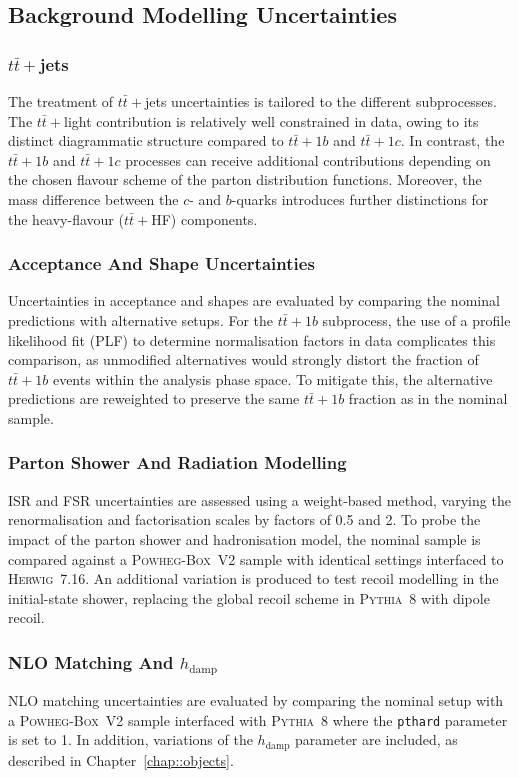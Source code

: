 \subsection{Background Modelling Uncertainties}

\subsubsection{$t\bar{t}+$jets}
The treatment of $t\bar{t}+$jets uncertainties is tailored to the different subprocesses. The $t\bar{t}+$light contribution is relatively well constrained in data, owing to its distinct diagrammatic structure compared to $t\bar{t}+1b$ and $t\bar{t}+1c$. In contrast, the $t\bar{t}+1b$ and $t\bar{t}+1c$ processes can receive additional contributions depending on the chosen flavour scheme of the parton distribution functions. Moreover, the mass difference between the $c$- and $b$-quarks introduces further distinctions for the heavy-flavour ($t\bar{t}+$HF) components.  

\subsubsection{Acceptance And Shape Uncertainties}
Uncertainties in acceptance and shapes are evaluated by comparing the nominal predictions with alternative setups. For the $t\bar{t}+1b$ subprocess, the use of a profile likelihood fit (PLF) to determine normalisation factors in data complicates this comparison, as unmodified alternatives would strongly distort the fraction of $t\bar{t}+1b$ events within the analysis phase space.  
To mitigate this, the alternative predictions are reweighted to preserve the same $t\bar{t}+1b$ fraction as in the nominal sample.  

\subsubsection{Parton Shower And Radiation Modelling}
ISR and FSR uncertainties are assessed using a weight-based method, varying the renormalisation and factorisation scales by factors of 0.5 and 2.  
To probe the impact of the parton shower and hadronisation model, the nominal sample is compared against a \textsc{Powheg-Box}~V2 sample with identical settings interfaced to \textsc{Herwig}~7.16. An additional variation is produced to test recoil modelling in the initial-state shower, replacing the global recoil scheme in \textsc{Pythia}~8 with dipole recoil.  

\subsubsection{NLO Matching And $h_{\text{damp}}$}
NLO matching uncertainties are evaluated by comparing the nominal setup with a \textsc{Powheg-Box}~V2 sample interfaced with \textsc{Pythia}~8 where the \texttt{pthard} parameter is set to 1.  In addition, variations of the $h_{\text{damp}}$ parameter are included, as described in Chapter~\ref{chap::objects}.  

